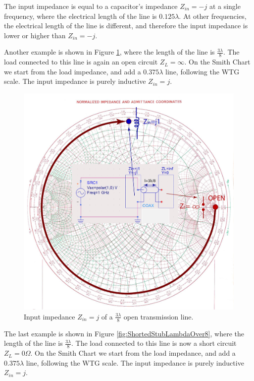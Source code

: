 \documentclass{ximera}
\begin{document}
The input impedance  is equal to a capacitor's impedance $Z_{in}=-j$ at a single frequency, where the electrical length of the line is $0.125 \lambda$. At other frequencies, the electrical length of the line is different, and therefore the input impedance is lower or higher than $Z_{in}=-j$.



Another example is shown in Figure \ref{fig:OpenStub3LambdaOver8}, where the length of the line is  $\frac{3 \lambda}{8}$. The load connected to this line is again an open circuit $Z_L=\infty$. On the Smith Chart we start from the load impedance, and add a $0.375 \lambda$ line, following the WTG scale. The input impedance is purely inductive $Z_{in}=j$.

\begin{figure}[htbp]
\begin{center}
\includegraphics[scale=0.4]{../jpg/openstub2-01.jpg}
\end{center}
\caption{Input impedance $Z_{in}=j$  of a $\frac{3 \lambda}{8}$ open transmission line.}
\label{fig:OpenStub3LambdaOver8}
\end{figure}


The last example is shown in Figure \ref{fig:ShortedStubLambdaOver8}, where the length of the line is  $\frac{3 \lambda}{8}$. The load connected to this line is now a short circuit $Z_L=0 \Omega$. On the Smith Chart we start from the load impedance, and add a $0.375 \lambda$ line, following the WTG scale. The input impedance is purely inductive $Z_{in}=j$.
\end{document}
